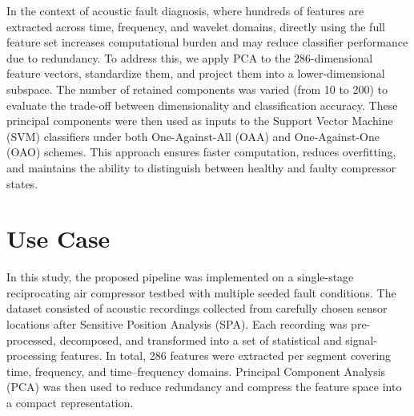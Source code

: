 \documentclass[12pt,a4paper]{article}
\begin{document}
\begin{multicols}{2}
In the context of acoustic fault diagnosis, where hundreds of features are
extracted across time, frequency, and wavelet domains, directly using the full
feature set increases computational burden and may reduce classifier performance
due to redundancy. To address this, we apply PCA to the $286$-dimensional feature
vectors, standardize them, and project them into a lower-dimensional subspace.
The number of retained components was varied (from 10 to 200) to evaluate the
trade-off between dimensionality and classification accuracy. These principal
components were then used as inputs to the Support Vector Machine (SVM)
classifiers under both One-Against-All (OAA) and One-Against-One (OAO) schemes. This
approach ensures faster computation, reduces overfitting, and maintains the
ability to distinguish between healthy and faulty compressor states.
\section{Use Case}

In this study, the proposed pipeline was implemented on a single-stage reciprocating air compressor testbed with multiple seeded fault conditions. The dataset consisted of acoustic recordings collected from carefully chosen sensor locations after Sensitive Position Analysis (SPA). Each recording was pre-processed, decomposed, and transformed into a set of statistical and signal-processing features. In total, 286 features were extracted per segment covering time, frequency, and time–frequency domains. Principal Component Analysis (PCA) was then used to reduce redundancy and compress the feature space into a compact representation. 



\end{multicols}
\end{document}
